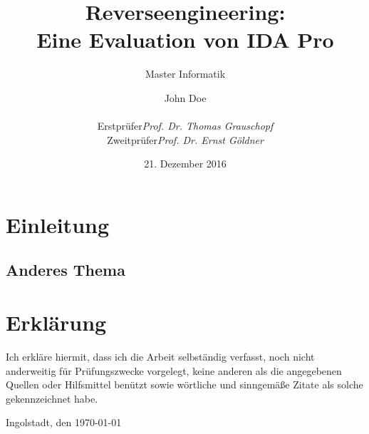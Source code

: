 

\title{Reverseengineering:\\ Eine Evaluation von IDA Pro}
\subtitle{Master Informatik}
\subject{MASTERARBEIT}

\author{John Doe \\[0.5cm]
\begin{tabular}{rl}
Erstprüfer & \emph{Prof. Dr. Thomas Grauschopf}\\
Zweitprüfer & \emph{Prof. Dr. Ernst Göldner}
\end{tabular}
}

\date{21. Dezember 2016}

\usepackage{tikz}


\tableofcontents
\clearpage
\listoffigures
\clearpage

\chapter{Einleitung}
\blindtext
\section{Anderes Thema}
\blindtext[3]

\printbibliography


\chapter*{Erklärung}
Ich erkläre hiermit, dass ich die Arbeit selbständig verfasst, noch nicht anderweitig für Prüfungszwecke vorgelegt, keine anderen als die angegebenen Quellen oder Hilfsmittel benützt sowie wörtliche und sinngemäße Zitate als solche gekennzeichnet habe.

\vspace{3\baselineskip}
\noindent Ingolstadt, den \today

\par\noindent\makebox[2.5in]{} \hfill\makebox[2.0in]{\hrulefill}%
\\\hspace*{8cm}{Max Mustermann}




